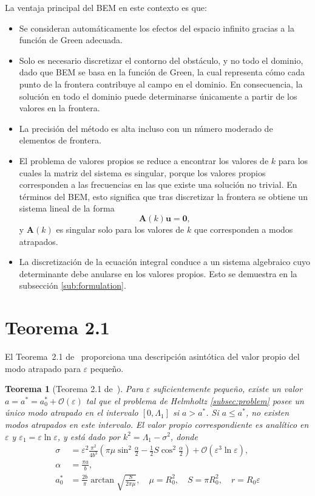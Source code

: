 \documentclass[11pt]{article}
\newtheorem{theorem}{Teorema}
\begin{document}
La ventaja principal del BEM en este contexto es que:
\begin{itemize}
    \item Se consideran automáticamente los efectos del espacio infinito gracias a la función de Green adecuada.
    \item Solo es necesario discretizar el contorno del obstáculo, y no todo el dominio, dado que BEM se basa en la función de Green, la cual representa cómo cada punto de la frontera contribuye al campo en el dominio. En consecuencia, la solución en todo el dominio puede determinarse únicamente a partir de los valores en la frontera.
    \item La precisión del método es alta incluso con un número moderado de elementos de frontera.
    \item El problema de valores propios se reduce a encontrar los valores de $k$ para los cuales la matriz del sistema es singular, porque los valores propios corresponden a las frecuencias en las que existe una solución no trivial. En términos del BEM, esto significa que tras discretizar la frontera se obtiene un sistema lineal de la forma
    \[
    \mathbf{A}(k) \mathbf{u} = \mathbf{0},
    \]
    y $\mathbf{A}(k)$ es singular solo para los valores de $k$ que corresponden a modos atrapados. 
    \item La discretización de la ecuación integral conduce a un sistema algebraico cuyo determinante debe anularse en los valores propios. Esto se demuestra en la subsección \ref{sub:formulation}.

\end{itemize}

\section{Teorema 2.1}

El Teorema~2.1 de~\cite{Zhevandrov2025} proporciona una descripción asintótica del valor propio del modo atrapado para \(\varepsilon\) pequeño.

\begin{theorem}[Teorema 2.1 de~\cite{Zhevandrov2025}]
Para $\varepsilon$ suficientemente pequeño, existe un valor $a = a^* = a_0^* + \mathcal{O}(\varepsilon)$ tal que el problema de Helmholtz \ref{subsec:problem} posee un único modo atrapado en el intervalo $[0, \Lambda_1]$ si $a > a^*$. Si $a \le a^*$, no existen modos atrapados en este intervalo. El valor propio correspondiente es analítico en $\varepsilon$ y $\varepsilon_1 = \varepsilon \ln \varepsilon$, y está dado por $k^2 = \Lambda_1 - \sigma^2$, donde
\begin{align}
\sigma &= \varepsilon^2\frac{\pi^2}{4b^3} \left( \pi \mu\sin^2 \frac{\alpha}{2} - \frac{1}{2} S \cos^2 \frac{\alpha}{2} \right) + \mathcal{O}(\varepsilon^3 \ln \varepsilon), \\
\alpha &= \frac{\pi a}{b}, \\
a_0^* &= \frac{2b}{\pi} \arctan \sqrt{\frac{S}{2\pi\mu}}, \quad \mu = R_0^2, \quad S = \pi R_0^2, \quad r = R_0\varepsilon
\end{align}
\end{theorem}
\end{document}
